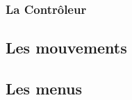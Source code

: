\subsubsection{La Contrôleur}
\label{subsubsec:controleur}

\subsection*{Les mouvements}

\subsection*{Les menus}

